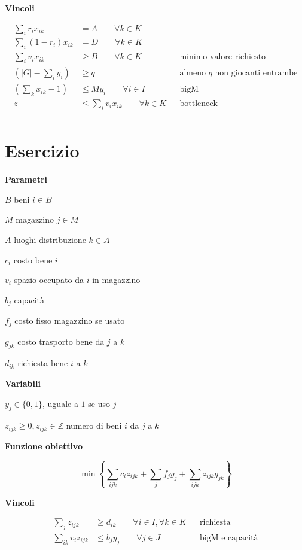 \documentclass[10pt,a4paper,twoside,openright]{book}
\newcounter{es}
\newcommand{\Es}{
	\stepcounter{es}
	\section{Esercizio \arabic{es}}
	}
\numberwithin{es}{chapter}
\newcommand{\Par}{\textbf{Parametri}}
\newcommand{\Var}{\textbf{Variabili}}
\newcommand{\Fob}{\textbf{Funzione obiettivo}}
\newcommand{\Vin}{\textbf{Vincoli}}
\begin{document}
\Vin

\begin{align*}
	\sum _{i} r_{i} x_{ik} &=A\qquad\forall k\in K && \text{} \\
	\sum _{i}( 1-r_{i}) x_{ik} &=D\qquad\forall k\in K && \text{} \\
	\sum _{i} v_{i} x_{ik} &\geq B\qquad\forall k\in K && \text{minimo valore richiesto} \\
	\left( |G|-\sum _{i} y_{i}\right) &\geq q && \text{almeno $q$ non giocanti entrambe} \\
	\left(\sum _{k} x_{ik} -1\right) &\leq My_{i} \qquad\forall i\in I && \text{bigM} \\
	z&\leq \sum _{i} v_{i} x_{ik} \qquad\forall k\in K && \text{bottleneck} \\
\end{align*}

\Es

\Par

$B$ beni $i\in B$

$M$ magazzino $j\in M$

$A$ luoghi distribuzione $k\in A$

$c_{i}$ costo bene $i$

$v_{i}$ spazio occupato da $i$ in magazzino

$b_{j}$ capacità

$f_{j}$ costo fisso magazzino se usato

$g_{jk}$ costo trasporto bene da $j$ a $k$

$d_{ik}$ richiesta bene $i$ a $k$

\Var

$y_{j} \in \{0,1\}$, uguale a $1$ se uso $j$

$z_{ijk} \geq 0,z_{ijk} \in \mathbb{Z}$ numero di beni $i$ da $j$ a $k$

\Fob

\begin{equation*}
	\min\left\{\sum _{ijk} c_{i} z_{ijk} +\sum _{j} f_{j} y_{j} +\sum _{ijk} z_{ijk} g_{jk}\right\}
\end{equation*}

\Vin

\begin{align*}
	\sum _{j} z_{ijk} &\geq d_{ik} \qquad\forall i\in I,\forall k\in K && \text{richiesta} \\
	\sum _{ik} v_{i} z_{ijk} &\leq b_{j} y_{j} \qquad\forall j\in J && \text{bigM e capacità} \\
\end{align*}
\end{document}
